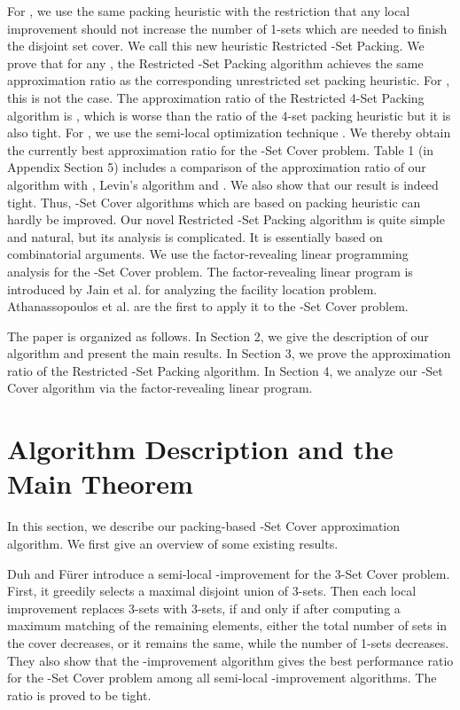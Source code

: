 \documentclass[runningheads,a4paper]{llncs}
\numberwithin{equation}{section}
\begin{document}
For , we use the same packing heuristic with the restriction that any local improvement should not increase the number of 1-sets which are needed to finish the disjoint set cover. We call this new heuristic Restricted -Set Packing. We prove that for any , the Restricted -Set Packing algorithm achieves the same approximation ratio as the corresponding unrestricted set packing heuristic. For , this is not the case. The approximation ratio of the Restricted 4-Set Packing algorithm is , which is worse than the  ratio of the 4-set packing heuristic but it is also tight. For , we use the semi-local optimization technique \cite{furer}. We thereby obtain the currently best approximation ratio for the -Set Cover problem. Table 1 (in Appendix Section 5) includes a comparison of the approximation ratio of our algorithm with  \cite{furer}, Levin's algorithm \cite{levin} and  \cite{lp}. We also show that our result is indeed tight. Thus, -Set Cover algorithms which are based on packing heuristic can hardly be improved. Our novel Restricted -Set Packing algorithm is quite simple and natural, but its analysis is complicated. It
is essentially based on combinatorial arguments. We use the factor-revealing linear programming analysis for the -Set Cover problem. The factor-revealing linear program is introduced by Jain et al. \cite{lp1} for analyzing the facility location problem. Athanassopoulos et al. \cite{lp} are the first to apply it to the -Set Cover problem.

The paper is organized as follows. In Section 2, we give the description of our algorithm and present the main results. In Section 3, we prove the approximation ratio of the Restricted -Set Packing algorithm. In Section 4, we analyze our -Set Cover algorithm via the factor-revealing linear program.


\section{Algorithm Description and the Main Theorem}

In this section, we describe our packing-based -Set Cover approximation algorithm. We first give an overview of some existing results.

Duh and F\"{u}rer \cite{furer} introduce a semi-local -improvement for the 3-Set Cover problem. First, it greedily selects a maximal disjoint union of 3-sets. Then each local improvement replaces  3-sets with  3-sets, if and only if after computing a maximum matching of the remaining elements, either the total number of sets in the cover decreases, or it remains the same, while the number of 1-sets decreases. They also show that the -improvement algorithm gives the best performance ratio for the -Set Cover problem among all semi-local -improvement algorithms. The ratio is proved to be tight.
\end{document}
